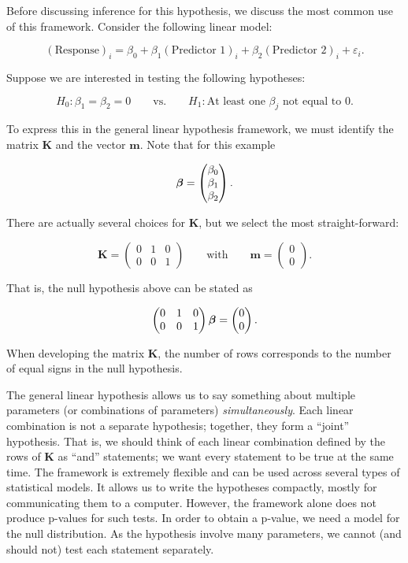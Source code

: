 \documentclass[
]{book}
\theoremstyle{plain}
\theoremstyle{mydefn}
\theoremstyle{myexmpl}
\theoremstyle{remark}
\begin{document}
Before discussing inference for this hypothesis, we discuss the most common use of this framework. Consider the following linear model:

\[(\text{Response})_i = \beta_0 + \beta_1 (\text{Predictor 1})_i + \beta_2 (\text{Predictor 2})_i + \varepsilon_i.\]

Suppose we are interested in testing the following hypotheses:

\[H_0: \beta_1 = \beta_2 = 0 \qquad \text{vs.} \qquad H_1: \text{At least one } \beta_j \text{ not equal to 0}.\]

To express this in the general linear hypothesis framework, we must identify the matrix \(\bm{K}\) and the vector \(\bm{m}\). Note that for this example

\[\boldsymbol{\beta} = \begin{pmatrix} 
\beta_0 \\
\beta_1 \\
\beta_2 \end{pmatrix}.\]

There are actually several choices for \(\bm{K}\), but we select the most straight-forward:

\[\bm{K} = \begin{pmatrix}
0 & 1 & 0 \\
0 & 0 & 1 \end{pmatrix} \qquad \text{with} \qquad \bm{m} = \begin{pmatrix}
0 \\ 0 \end{pmatrix}.\]

That is, the null hypothesis above can be stated as

\[\begin{pmatrix} 0 & 1 & 0 \\ 0 & 0 & 1 \end{pmatrix} \boldsymbol{\beta} = \begin{pmatrix} 0 \\ 0 \end{pmatrix}.\]

\begin{rmdtip}
When developing the matrix \(\bm{K}\), the number of rows corresponds to the number of equal signs in the null hypothesis.
\end{rmdtip}

The general linear hypothesis allows us to say something about multiple parameters (or combinations of parameters) \emph{simultaneously}. Each linear combination is not a separate hypothesis; together, they form a ``joint'' hypothesis. That is, we should think of each linear combination defined by the rows of \(\bm{K}\) as ``and'' statements; we want every statement to be true at the same time. The framework is extremely flexible and can be used across several types of statistical models. It allows us to write the hypotheses compactly, mostly for communicating them to a computer. However, the framework alone does not produce p-values for such tests. In order to obtain a p-value, we need a model for the null distribution. As the hypothesis involve many parameters, we cannot (and should not) test each statement separately.
\end{document}
